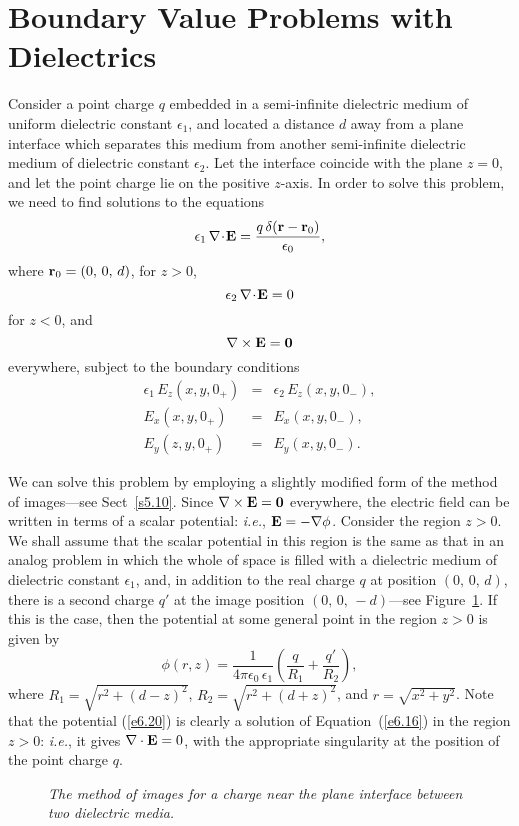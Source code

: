 \section{Boundary Value Problems with Dielectrics}
Consider a point charge $q$ embedded in a semi-infinite dielectric medium of uniform dielectric constant
$\epsilon_1$, and located a distance $d$ away from a plane interface which
separates this medium from another semi-infinite dielectric medium of
dielectric constant
$\epsilon_2$. Let the interface  coincide with the plane $z=0$, and
let the point charge lie on the positive $z$-axis. In order to solve this  problem, 
we need to find solutions to the equations
\begin{equation}\label{e6.16}
\epsilon_1\, \nabla\!\cdot\!{\bf E} = \frac{q\,\delta({\bf r}-{\bf r}_0)}{\epsilon_0},
\end{equation}
where ${\bf r}_0=(0,\,0,\,d)$, for $z>0$,
\begin{equation}\label{e6.17}
\epsilon_2\,\nabla\!\cdot\!{\bf E} = 0
\end{equation}
for $z<0$, and
\begin{equation}
\nabla\times{\bf E} = {\bf 0}
\end{equation}
everywhere, subject to the boundary conditions 
\begin{eqnarray}\label{e6.19a}
\epsilon_1\, E_z(x,y,0_+) &=& \epsilon_2 \,E_z (x,y,0_-),\\[0.5ex]\label{e6.19b}
E_x (x,y,0_+) &=& E_x (x,y,0_-),\\[0.5ex]
E_y (z,y,0_+) &=& E_y(x,y,0_-).\label{e6.19c}
\end{eqnarray}

We can  solve this problem by employing a slightly modified form of
the  method of images---see Sect~\ref{s5.10}. Since $\nabla\times{\bf E} ={\bf  0}$ everywhere,
the electric field can be written in terms of a scalar potential: {\em i.e.}, ${\bf E} =-\nabla \phi$. Consider the region $z>0$. 
We shall assume that the scalar potential in this region is the same as
that in an analog problem in which the whole of space is filled with a dielectric medium of dielectric constant
$\epsilon_1$, and, in addition to the real charge $q$ at position $(0,\,0,\,d)$,
there is a second charge $q'$ at the image position $(0,\,0,\,-d)$---see Figure~\ref{fimagex}. 
If this is the case, then the potential at some general point 
in the region $z>0$ is given by
\begin{equation}\label{e6.20}
\phi(r,z) = \frac{1}{4\pi\epsilon_0\, \epsilon_1}\left(\frac{q}{R_1}
+ \frac{q'}{R_2}\right),
\end{equation}
where $R_1= \sqrt{r^2+(d-z)^2}$, $R_2= \sqrt{r^2+(d+z)^2}$,  and
$r=\sqrt{x^2+y^2}$. 
Note that the potential (\ref{e6.20})  is clearly a solution of Equation~(\ref{e6.16}) in
the region $z>0$: {\em i.e.}, it gives $\nabla \cdot {\bf E}  = 0$, with the
appropriate singularity at the position of the point charge $q$. 
\begin{figure}
 \epsfysize=2.25in
\centerline{}
\caption{\em The method of images for a charge near the plane interface
between two dielectric media.}\label{fimagex}
\end{figure}


